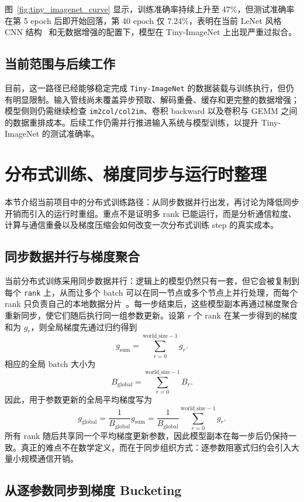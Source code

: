 \documentclass[a4paper,11pt,oneside]{article}
\begin{document}
图~\ref{fig:tiny_imagenet_curve} 显示，训练准确率持续上升至 47\%，但测试准确率在第 5 epoch 后即开始回落，第 40 epoch 仅 7.24\%，表明在当前 LeNet 风格 CNN 结构~\cite{lecun1998} 和无数据增强的配置下，模型在 Tiny-ImageNet 上出现严重过拟合。

\clearpage
\subsection{当前范围与后续工作}

目前，这一路径已经能够稳定完成 \texttt{Tiny-ImageNet} 的数据装载与训练执行，但仍有明显限制。输入管线尚未覆盖异步预取、解码重叠、缓存和更完整的数据增强；模型侧则仍需继续检查 \texttt{im2col/col2im}、卷积 backward 以及卷积与 GEMM 之间的数据重排成本。后续工作仍需并行推进输入系统与模型训练，以提升 Tiny-ImageNet 的测试准确率。

\section{分布式训练、梯度同步与运行时整理}

本节介绍当前项目中的分布式训练路径：从同步数据并行出发，再讨论为降低同步开销而引入的运行时重组。重点不是证明多 rank 已能运行，而是分析通信粒度、计算与通信重叠以及梯度压缩会如何改变一次分布式训练 step 的真实成本。

\subsection{同步数据并行与梯度聚合}

当前分布式训练采用同步数据并行：逻辑上的模型仍然只有一套，但它会被复制到每个 \texttt{rank} 上，从而让多个 batch 可以在同一节点或多个节点上并行处理，而每个 rank 只负责自己的本地数据分片~\cite{sergeev2018horovod}。每一步结束后，这些模型副本再通过梯度聚合重新同步，使它们随后执行同一组参数更新。设第 $r$ 个 rank 在某一步得到的梯度和为 $g_r$，则全局梯度先通过归约得到
\[
g_{\mathrm{sum}}=\sum_{r=0}^{\mathrm{world\_size}-1} g_r.
\]
相应的全局 batch 大小为
\[
B_{\mathrm{global}}=\sum_{r=0}^{\mathrm{world\_size}-1} B_r.
\]
因此，用于参数更新的全局平均梯度写为
\[
g_{\mathrm{global}}
=\frac{1}{B_{\mathrm{global}}}g_{\mathrm{sum}}
=\frac{1}{B_{\mathrm{global}}}\sum_{r=0}^{\mathrm{world\_size}-1} g_r.
\]
所有 rank 随后共享同一个平均梯度更新参数，因此模型副本在每一步后仍保持一致。真正的难点不在数学定义，而在于同步组织方式：逐参数阻塞式归约会引入大量小规模通信开销。

\subsection{从逐参数同步到梯度 Bucketing}
\end{document}
